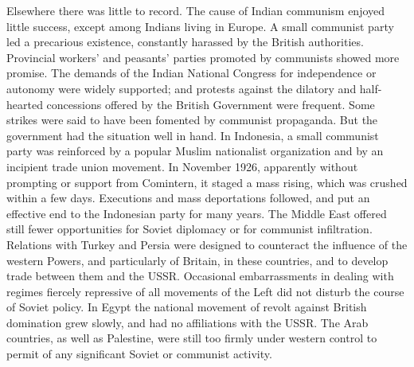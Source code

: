 Elsewhere there was little to record. The cause of Indian communism enjoyed little success, except among Indians living in Europe. A small communist party led a precarious existence, constantly harassed by the British authorities. Provincial workers' and peasants' parties promoted by communists showed more promise. The demands of the Indian National Congress for independence or autonomy were widely supported; and protests against the dilatory and half-hearted concessions offered by the British Government were frequent. Some strikes were said to have been fomented by communist propaganda. But the government had the situation well in hand. In Indonesia, a small communist party was reinforced by a popular Muslim nationalist organization and by an incipient trade union movement. In November 1926, apparently without prompting or support from Comintern, it staged a mass rising, which was crushed within a few days. Executions and mass deportations followed, and put an effective end to the Indonesian party for many years. The Middle East offered still fewer opportunities for Soviet diplomacy or for communist infiltration. Relations with Turkey and Persia were designed to counteract the influence of the western Powers, and particularly of Britain, in these countries, and to develop trade between them and the USSR. Occasional embarrassments in dealing with regimes fiercely repressive of all movements of the Left did not disturb the course of Soviet policy. In Egypt the national movement of revolt against British domination grew slowly, and had no affiliations with the USSR. The Arab countries, as well as Palestine, were still too firmly under western control to permit of any significant Soviet or communist activity. 

